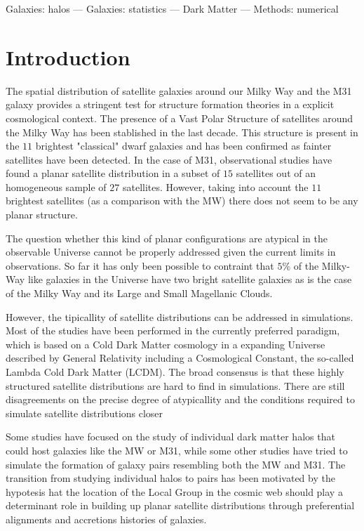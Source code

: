 \documentclass[a4paper,fleqn,usenatbib]{mnras}
\begin{document}
\begin{keywords}Galaxies: halos --- Galaxies: statistics --- Dark
  Matter --- Methods: numerical  
\end{keywords}

\section{Introduction}

The spatial distribution of satellite galaxies around our Milky Way and the
M31 galaxy provides a stringent test for structure formation theories
in a explicit cosmological context. 
The presence of a Vast Polar Structure of satellites around the Milky
Way has been stablished in the last decade.
This structure is present in the $11$ brightest "classical" dwarf
galaxies and has been confirmed as fainter satellites have been
detected. 
In the case of M31,  observational studies have found a planar satellite
distribution in a subset of $15$ satellites out of an homogeneous
sample of $27$ satellites. 
However, taking into account the $11$ brightest satellites (as a
comparison with the MW) there does not seem to be any planar structure.

The question whether this kind of planar configurations are atypical
in the observable Universe cannot be properly addressed given the
current limits in observations. 
So far it has only been possible to contraint that $5\%$ of the
Milky-Way like galaxies in the Universe have two bright satellite
galaxies as is the case of the Milky Way and its Large and Small
Magellanic Clouds. 

However, the tipicallity of satellite distributions can be addressed
in simulations.
Most of the studies have been performed in the currently preferred
paradigm, which is based on a Cold Dark Matter cosmology in a expanding
Universe described by General Relativity including a Cosmological
Constant, the so-called Lambda Cold Dark Matter (LCDM).
The broad consensus is that these highly structured satellite distributions
are hard to find in simulations.  
There are still disagreements on the precise degree of atypicallity
and the conditions required to simulate satellite distributions closer 

Some studies have focused on the study of individual dark matter halos
that could host galaxies like the MW or M31, while some other studies
have tried to simulate the formation of galaxy pairs resembling both
the MW and M31.
The transition from studying individual halos to pairs has been
motivated by the hypotesis hat the location of the Local Group in
the cosmic web should play a determinant role in building up planar
satellite distributions through preferential alignments and accretions
histories of galaxies.
\end{document}
